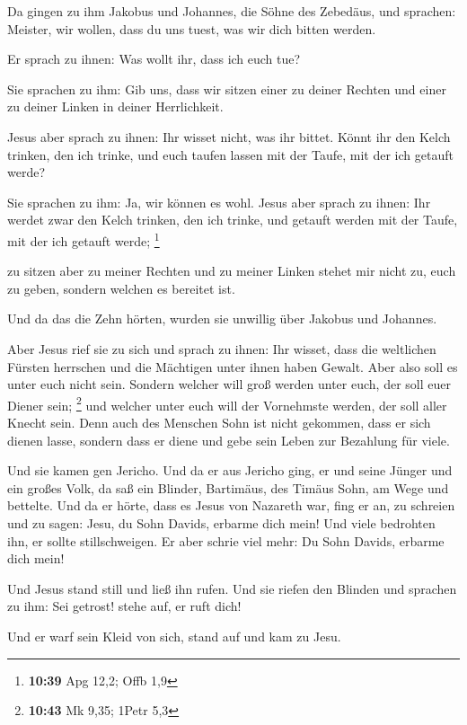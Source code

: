  Da gingen zu ihm Jakobus und Johannes, die Söhne des
Zebedäus, und sprachen: Meister, wir wollen, dass du uns tuest, was wir
dich bitten werden.

 Er sprach zu ihnen: Was wollt ihr, dass ich euch tue?

 Sie sprachen zu ihm: Gib uns, dass wir sitzen einer zu
deiner Rechten und einer zu deiner Linken in deiner Herrlichkeit.

 Jesus aber sprach zu ihnen: Ihr wisset nicht, was ihr
bittet. Könnt ihr den Kelch trinken, den ich trinke, und euch taufen
lassen mit der Taufe, mit der ich getauft werde?

 Sie sprachen zu ihm: Ja, wir können es wohl. Jesus aber
sprach zu ihnen: Ihr werdet zwar den Kelch trinken, den ich trinke, und
getauft werden mit der Taufe, mit der ich getauft werde; \footnote{\textbf{10:39}
  Apg 12,2; Offb 1,9}

 zu sitzen aber zu meiner Rechten und zu meiner Linken
stehet mir nicht zu, euch zu geben, sondern welchen es bereitet ist.

 Und da das die Zehn hörten, wurden sie unwillig über
Jakobus und Johannes.

 Aber Jesus rief sie zu sich und sprach zu ihnen: Ihr
wisset, dass die weltlichen Fürsten herrschen und die Mächtigen unter
ihnen haben Gewalt.  Aber also soll es unter euch nicht
sein. Sondern welcher will groß werden unter euch, der soll euer Diener
sein; \footnote{\textbf{10:43} Mk 9,35; 1Petr 5,3}  und
welcher unter euch will der Vornehmste werden, der soll aller Knecht
sein.  Denn auch des Menschen Sohn ist nicht gekommen, dass
er sich dienen lasse, sondern dass er diene und gebe sein Leben zur
Bezahlung für viele.

 Und sie kamen gen Jericho. Und da er aus Jericho ging, er
und seine Jünger und ein großes Volk, da saß ein Blinder, Bartimäus, des
Timäus Sohn, am Wege und bettelte.  Und da er hörte, dass
es Jesus von Nazareth war, fing er an, zu schreien und zu sagen: Jesu,
du Sohn Davids, erbarme dich mein!  Und viele bedrohten
ihn, er sollte stillschweigen. Er aber schrie viel mehr: Du Sohn Davids,
erbarme dich mein!

 Und Jesus stand still und ließ ihn rufen. Und sie riefen
den Blinden und sprachen zu ihm: Sei getrost! stehe auf, er ruft dich!

 Und er warf sein Kleid von sich, stand auf und kam zu
Jesu.

